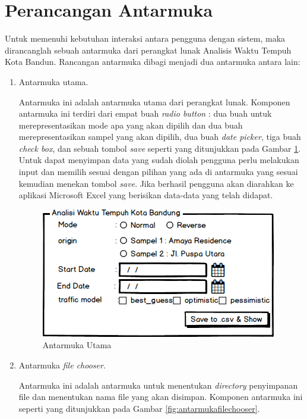 \section{Perancangan Antarmuka}
\label{sec:perancanganantarmuka}

Untuk memenuhi kebutuhan interaksi antara pengguna dengan sistem, maka dirancanglah sebuah antarmuka dari perangkat lunak Analisis Waktu Tempuh Kota Bandun. Rancangan antarmuka dibagi menjadi dua antarmuka antara lain:
\begin{enumerate}
	\item Antarmuka utama.
	
	Antarmuka ini adalah antarmuka utama dari perangkat lunak. Komponen antarmuka ini terdiri dari empat buah \textit{radio button} : dua buah untuk merepresentasikan mode apa yang akan dipilih dan dua buah merepresentasikan sampel yang akan dipilih, dua buah  \textit{date picker}, tiga buah \textit{check box}, dan sebuah tombol \textit{save} seperti yang ditunjukkan pada Gambar \ref{fig:antarmukautama}. Untuk dapat menyimpan data yang sudah diolah pengguna perlu melakukan input dan memilih sesuai dengan pilihan yang ada di antarmuka yang sesuai kemudian menekan tombol \textit{save}. Jika berhasil pengguna akan diarahkan ke aplikasi Microsoft Excel yang berisikan data-data yang telah didapat.
	
	\begin{figure}[H]
				\centering		
				\includegraphics[scale=0.7]{Gambar/Antarmukautama.png}
				\caption[Antarmuka Utama]{Antarmuka Utama}
				\label{fig:antarmukautama}	
			\end{figure}
	
	\item Antarmuka \textit{file chooser}.
	
	Antarmuka ini adalah antarmuka untuk menentukan \textit{directory} penyimpanan file dan menentukan nama file yang akan disimpan. Komponen antarmuka ini seperti yang ditunjukkan pada Gambar \ref{fig:antarmukafilechooser}.
	

\end{enumerate}
